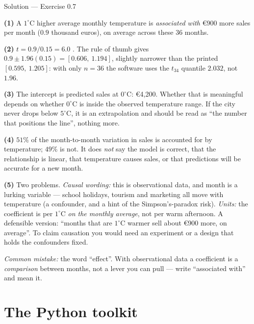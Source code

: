 \documentclass[aspectratio=169,11pt]{beamer}
\begin{document}
\begin{frame}{Solution --- Exercise 0.7}
  \begin{solutionbox}
    \scriptsize
    \textbf{(1)} A $1^\circ$C higher average monthly temperature is
    \emph{associated with} \euro 900 more sales per month
    ($0.9$ thousand euros), on average across these 36 months.

    \textbf{(2)} $t = 0.9/0.15 = 6.0$ \checkmark. The rule of thumb gives
    $0.9 \pm 1.96(0.15) = [0.606,\ 1.194]$, slightly narrower than the printed
    $[0.595,\ 1.205]$: with only $n = 36$ the software uses the $t_{34}$
    quantile $2.032$, not $1.96$.

    \textbf{(3)} The intercept is predicted sales at $0^\circ$C:
    \euro 4{,}200. Whether that is meaningful depends on whether $0^\circ$C
    is inside the observed temperature range. If the city never drops below
    $5^\circ$C, it is an extrapolation and should be read as ``the number
    that positions the line'', nothing more.

    \textbf{(4)} $51\%$ of the month-to-month variation in sales is accounted
    for by temperature; $49\%$ is not. It does \emph{not} say the model is
    correct, that the relationship is linear, that temperature causes sales,
    or that predictions will be accurate for a new month.

    \textbf{(5)} Two problems. \emph{Causal wording:} this is observational
    data, and month is a lurking variable --- school holidays, tourism and
    marketing all move with temperature (a confounder, and a hint of the
    Simpson's-paradox risk). \emph{Units:} the coefficient is per
    $1^\circ$C \emph{on the monthly average}, not per warm afternoon.
    A defensible version: ``months that are $1^\circ$C warmer sell about
    \euro 900 more, on average''. To claim causation you would need an
    experiment or a design that holds the confounders fixed.

    \smallskip
    \textit{Common mistake:} the word ``effect''. With observational data a
    coefficient is a \emph{comparison} between months, not a lever you can
    pull --- write ``associated with'' and mean it.
  \end{solutionbox}
\end{frame}


\section{The Python toolkit}
\end{document}
